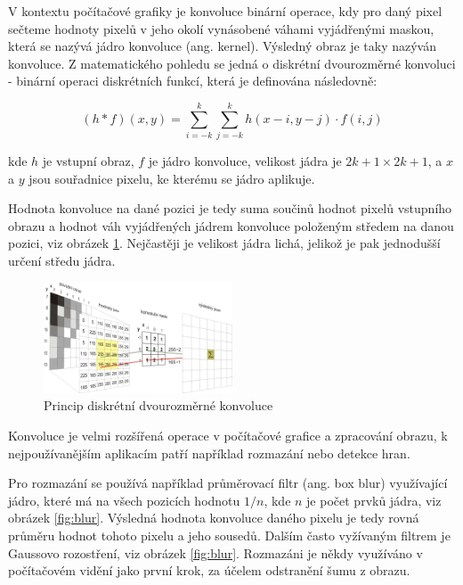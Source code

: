 V kontextu počítačové grafiky je konvoluce binární operace, kdy pro daný pixel
sečteme hodnoty pixelů v jeho okolí vynásobené váhami vyjádřenými maskou, která
se nazývá jádro konvoluce (ang. kernel). Výsledný obraz je taky nazýván
konvoluce. Z matematického pohledu se jedná o diskrétní dvourozměrné konvoluci
- binární operaci diskrétních funkcí, která je definována následovně:

\begin{equation*}
    (h*f)(x,y)=\sum _{i=-k}^{k}\sum _{j=-k}^{k}h(x-i,y-j)\cdot f(i,j)
\end{equation*}

kde $h$ je vstupní obraz, $f$ je jádro konvoluce, velikost jádra je $2k+1
    \times 2k+1$, a $x$ a $y$ jsou souřadnice pixelu, ke kterému se jádro aplikuje.

Hodnota konvoluce na dané pozici je tedy suma součinů hodnot pixelů vstupního
obrazu a hodnot váh vyjádřených jádrem konvoluce položeným středem na danou
pozici, viz obrázek \ref{fig:convolution}. Nejčastěji je velikost jádra lichá,
jelikož je pak jednodušší určení středu jádra.

\begin{figure}[]
    \centering
    \includegraphics[width=0.5\textwidth]{Figures/convolution.jpg}
    \caption{Princip diskrétní dvourozměrné konvoluce \cite{}}
    \label{fig:convolution}
\end{figure}

Konvoluce je velmi rozšířená operace v počítačové grafice a zpracování obrazu,
k nejpoužívanějším aplikacím patří například rozmazání nebo detekce hran.

Pro rozmazání se používá například průměrovací filtr (ang. box blur)
využívající jádro, které má na všech pozicích hodnotu $1/n$, kde $n$ je počet
prvků jádra, viz obrázek \ref{fig:blur}. Výsledná hodnota konvoluce daného
pixelu je tedy rovná průměru hodnot tohoto pixelu a jeho sousedů. Dalším často
vyžívaným filtrem je Gaussovo rozostření, viz obrázek \ref{fig:blur}. Rozmazáni
je někdy využíváno v počítačovém vidění jako první krok, za účelem odstranění
šumu z obrazu.

